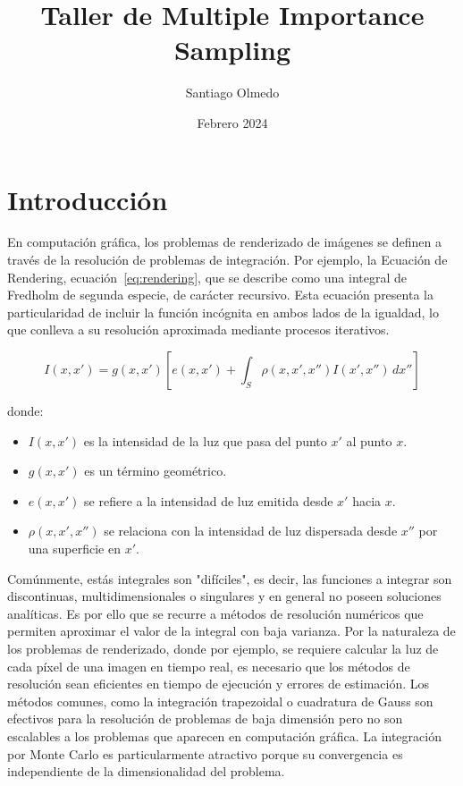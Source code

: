 \documentclass{article}
\title{Taller de Multiple Importance Sampling}
\author{Santiago Olmedo}
\date{Febrero 2024}
\begin{document}

\maketitle

\section{Introducción}

En computación gráfica, los problemas de renderizado de imágenes se definen a través de la resolución de problemas de integración. Por ejemplo, la Ecuación de Rendering, ecuación~\ref{eq:rendering}, que se describe como una integral de Fredholm de segunda especie, de carácter recursivo. Esta ecuación presenta la particularidad de incluir la función incógnita en ambos lados de la igualdad, lo que conlleva a su resolución aproximada mediante procesos iterativos.

\begin{equation} \label{eq:rendering}
I(x,x') = g(x,x') \left[ e(x,x') + \int_{S} \rho(x,x',x'')I(x',x'') \, dx'' \right]
\end{equation}

donde:
\begin{itemize}
    \item \( I(x,x') \) es la intensidad de la luz que pasa del punto \( x' \) al punto \( x \).
    \item \( g(x,x') \) es un término geométrico.
    \item \( e(x,x') \) se refiere a la intensidad de luz emitida desde \( x' \) hacia \( x \).
    \item \( \rho(x,x',x'') \) se relaciona con la intensidad de luz dispersada desde \( x'' \) por una superficie en \( x' \).
\end{itemize}


Comúnmente, estás integrales son "difíciles", es decir, las funciones a integrar son discontinuas, multidimensionales o singulares y en general no poseen soluciones analíticas.
Es por ello que se recurre a métodos de resolución numéricos que permiten aproximar el valor de la integral con baja varianza.
Por la naturaleza de los problemas de renderizado, donde por ejemplo, se requiere calcular la luz de cada píxel de una imagen en tiempo real, es necesario que los métodos de resolución sean eficientes en tiempo de ejecución y errores de estimación.
Los métodos comunes, como la integración trapezoidal o cuadratura de Gauss son efectivos para la resolución de problemas de baja dimensión pero no son escalables a los problemas que aparecen en computación gráfica.
La integración por Monte Carlo es particularmente atractivo porque su convergencia es independiente de la dimensionalidad del problema.
\end{document}
